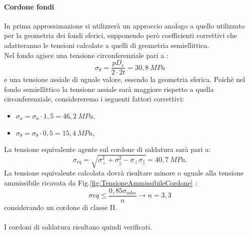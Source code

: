 \paragraph{Cordone fondi}
In prima approssimazione si utilizzerà un approccio analogo a quello utilizzato per la geometria dei fondi sferici, supponendo però coefficienti correttivi che adatteranno le tensioni calcolate a quelli di geometria semiellittica. \\
Nel fondo agisce una tensione circonferenziale pari a :
\begin{equation}
    \sigma_{\theta}=\frac{pD_e}{2\cdot 2t}=30,8\ MPa
\end{equation}
e una tensione assiale di uguale valore, essendo la geometria sferica. 
Poichè nel fondo semiellittico la tensione assiale sarà maggiore rispetto a quella circonferenziale, considereremo i seguenti fattori correttivi:
\begin{itemize}
    \item $\sigma_a=\sigma_a\cdot 1,5=46,2\ MPa$.
    \item $\sigma_{\theta}=\sigma_{\theta}\cdot 0,5=15,4\ MPa$,
\end{itemize}
La tensione equivalente agente sul cordone di saldatura sarà pari a:
\begin{equation}
    \sigma_{eq}=\sqrt{\sigma_{\perp}^2+\sigma_{\parallel}^2-\sigma_{\perp}\sigma_{\parallel}}=40,7\ MPa. 
\end{equation}
La tensione equivalente calcolata dovrà risultare minore o uguale alla tensione ammissibile ricavata da Fig.\ref{fig:TensioneAmmissibileCordone} :
\begin{equation}
    \sigma{eq}\le \frac{0,85\sigma_{adm}}{n}\to n=3,3
\end{equation}
considerando un cordone di classe II.\\
\\
I cordoni di saldatura risultano quindi verificati.